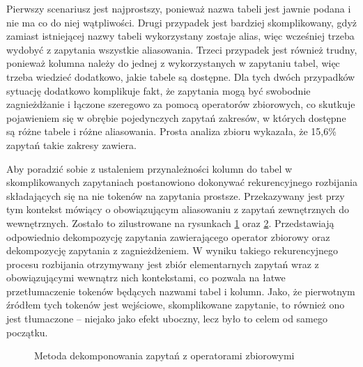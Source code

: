 Pierwszy scenariusz jest najprostszy, ponieważ nazwa tabeli jest jawnie podana i nie ma co do niej wątpliwości. Drugi przypadek jest bardziej skomplikowany, gdyż zamiast istniejącej nazwy tabeli wykorzystany zostaje alias, więc wcześniej trzeba wydobyć z zapytania wszystkie aliasowania. Trzeci przypadek jest również trudny, ponieważ kolumna należy do jednej z wykorzystanych w zapytaniu tabel, więc trzeba wiedzieć dodatkowo, jakie tabele są dostępne. Dla tych dwóch przypadków sytuację dodatkowo komplikuje fakt, że zapytania mogą być swobodnie zagnieżdżanie i łączone szeregowo za pomocą operatorów zbiorowych, co skutkuje pojawieniem się w obrębie pojedynczych zapytań zakresów, w których dostępne są różne tabele i różne aliasowania. Prosta analiza zbioru  wykazała, że 15,6\% zapytań takie zakresy zawiera. 

Aby poradzić sobie z ustaleniem przynależności kolumn do tabel w skomplikowanych zapytaniach postanowiono dokonywać rekurencyjnego rozbijania składających się na nie tokenów na zapytania prostsze. Przekazywany jest przy tym kontekst mówiący o obowiązującym aliasowaniu z zapytań zewnętrznych do wewnętrznych. Zostało to zilustrowane na rysunkach 
\ref{fig:query-decomposition-serial} oraz \ref{fig:query-decomposition-nested}. Przedstawiają odpowiednio dekompozycję zapytania zawierającego operator zbiorowy oraz dekompozycję zapytania z zagnieżdżeniem. W wyniku takiego rekurencyjnego procesu rozbijania otrzymywany jest zbiór elementarnych zapytań wraz z obowiązującymi wewnątrz nich kontekstami, co pozwala na łatwe przetłumaczenie tokenów będących nazwami tabel i kolumn. Jako, że pierwotnym źródłem tych tokenów jest wejściowe, skomplikowane zapytanie, to również ono jest tłumaczone -- niejako jako efekt uboczny, lecz było to celem od samego początku.

\begin{figure}[ht!]
  \centering
  
  \caption{Metoda dekomponowania zapytań z operatorami zbiorowymi}
  \label{fig:query-decomposition-serial}
\end{figure}

\begin{figure}[ht!]
  \centering
  
  \label{fig:query-decomposition-nested}
\end{figure}

